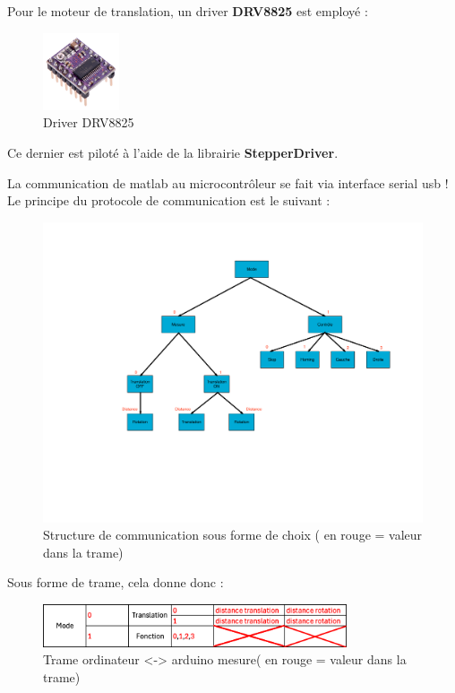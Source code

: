 Pour le moteur de translation, un driver \textbf{DRV8825} est employé :

\begin{figure}[H]
    \centering
    \includegraphics[width = 0.2\textwidth]{assets/figures/ameliorations/drv-8825.jpg}
    \caption[Driver DRV8825]{Driver DRV8825 \autocite{driver_DRV8825}\footnotemark}
\end{figure}
Ce dernier est piloté à l'aide de la librairie \textbf{StepperDriver}\cite{stepperDriver_lib}\footnotemark.


La communication de matlab au microcontrôleur se fait via interface serial usb !
Le principe du protocole de communication est le suivant :
\begin{figure}[H]
    \centering
    \includegraphics[page = 1, width = \textwidth, trim = {7cm 9cm 2cm 3cm},clip]{assets/figures/ameliorations/trame_comm.pdf}
    \caption[Structure de communication]{Structure de communication sous forme de choix ( en \color{red} rouge \color{black} = valeur dans la trame)}
\end{figure}
Sous forme de trame, cela donne donc :
\begin{figure}[H]
    \centering
    \includegraphics[width = 0.8\textwidth]{assets/figures/ameliorations/trame comm.png}
    \caption[Trame ordinateur <-> arduino mesure]{Trame ordinateur <-> arduino mesure( en \color{red} rouge \color{black} = valeur dans la trame)}
\end{figure}

